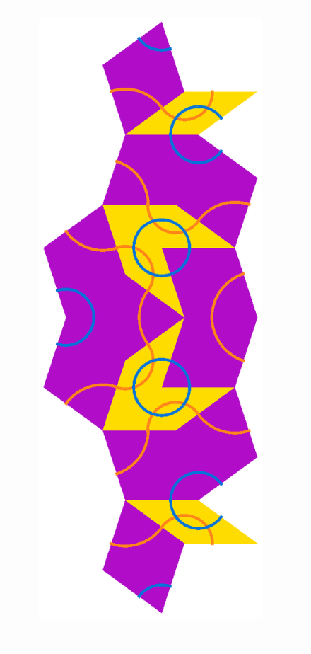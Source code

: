 \documentclass[]{article}
\begin{document}
\begin{figure}[H]
\begin{tabular}{cc}
\begin{subfigure}[b]{0.4\textwidth}
             \centering
             \includegraphics[scale=0.4]{SkinnyInflation3}
             \end{subfigure}   \\
             \begin{subfigure}[b]{0.4\textwidth}

\end{subfigure}
\end{tabular}
\end{figure}
\end{document}
